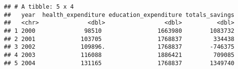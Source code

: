 \documentclass[
]{article}
\begin{document}
\begin{verbatim}
## # A tibble: 5 x 4
##   year  health_expenditure education_expenditure totals_savings
##   <chr>              <dbl>                 <dbl>          <dbl>
## 1 2000              98510                1663980        1083732
## 2 2001             103705                1768837         334438
## 3 2002             109896.               1768837        -746375
## 4 2003             116088                1886421         709085
## 5 2004             131165                1768837        1349740
\end{verbatim}
\end{document}
